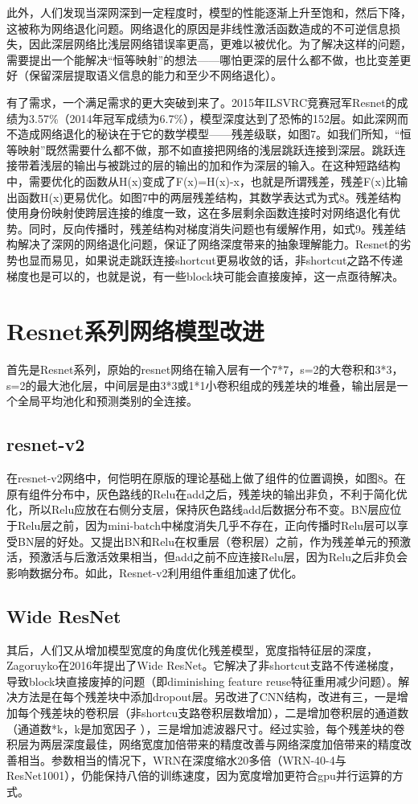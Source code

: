\documentclass[15pt]{article}
\begin{document}
此外，人们发现当深网深到一定程度时，模型的性能逐渐上升至饱和，然后下降，这被称为网络退化问题。网络退化的原因是非线性激活函数造成的不可逆信息损失\cite{ref52}，因此深层网络比浅层网络错误率更高，更难以被优化。为了解决这样的问题，需要提出一个能解决“恒等映射”的想法——哪怕更深的层什么都不做，也比变差更好（保留深层提取语义信息的能力和至少不网络退化）。

有了需求，一个满足需求的更大突破到来了。2015年ILSVRC竞赛冠军Resnet的成绩为3.57\%（2014年冠军成绩为6.7\%），模型深度达到了恐怖的152层\cite{ref53}。如此深网而不造成网络退化的秘诀在于它的数学模型——残差级联，如图7。如我们所知，“恒等映射”既然需要什么都不做，那不如直接把网络的浅层跳跃连接到深层。跳跃连接带着浅层的输出与被跳过的层的输出的加和作为深层的输入。在这种短路结构中，需要优化的函数从H(x)变成了F(x)=H(x)-x，也就是所谓残差，残差F(x)比输出函数H(x)更易优化。如图7中的两层残差结构，其数学表达式为式8。残差结构使用身份映射使跨层连接的维度一致，这在多层剩余函数连接时对网络退化有优势。同时，反向传播时，残差结构对梯度消失问题也有缓解作用，如式9。残差结构解决了深网的网络退化问题，保证了网络深度带来的抽象理解能力。Resnet的劣势也显而易见，如果说走跳跃连接shortcut更易收敛的话，非shortcut之路不传递梯度也是可以的，也就是说，有一些block块可能会直接废掉，这一点亟待解决。

\section{Resnet系列网络模型改进}
首先是Resnet系列，原始的resnet网络在输入层有一个7*7，s=2的大卷积和3*3，s=2的最大池化层，中间层是由3*3或1*1小卷积组成的残差块的堆叠，输出层是一个全局平均池化和预测类别的全连接。

\subsection{resnet-v2}
在resnet-v2网络中\cite{ref54}，何恺明在原版的理论基础上做了组件的位置调换，如图8。在原有组件分布中，灰色路线的Relu在add之后，残差块的输出非负，不利于简化优化，所以Relu应放在右侧分支层，保持灰色路线add后数据分布不变。BN层应位于Relu层之前，因为mini-batch中梯度消失几乎不存在，正向传播时Relu层可以享受BN层的好处。又提出BN和Relu在权重层（卷积层）之前，作为残差单元的预激活，预激活与后激活效果相当，但add之前不应连接Relu层，因为Relu之后非负会影响数据分布。如此，Resnet-v2利用组件重组加速了优化。

\subsection{Wide ResNet}
其后，人们又从增加模型宽度的角度优化残差模型，宽度指特征层的深度，Zagoruyko在2016年提出了Wide ResNet\cite{ref55}。它解决了非shortcut支路不传递梯度，导致block块直接废掉的问题（即diminishing feature reuse特征重用减少问题）。解决方法是在每个残差块中添加dropout层。另改进了CNN结构，改进有三，一是增加每个残差块的卷积层（非shortcu支路卷积层数增加），二是增加卷积层的通道数（通道数*k，k是加宽因子 ），三是增加滤波器尺寸。经过实验，每个残差块的卷积层为两层深度最佳，网络宽度加倍带来的精度改善与网络深度加倍带来的精度改善相当。参数相当的情况下，WRN在深度缩水20多倍（WRN-40-4与ResNet1001），仍能保持八倍的训练速度，因为宽度增加更符合gpu并行运算的方式。
\end{document}
